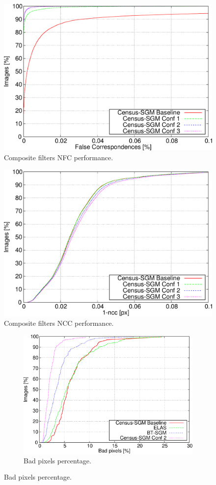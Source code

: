 \begin{figure}[h!]
  \centering
  \includegraphics[width=\textwidth, height=0.5\textwidth, trim=0 0 0 0,clip]{comp_nfc_perc}
  \caption{ Composite filters NFC performance.}
  \label{fig:cp03_composite_NFC}
\end{figure}%

\begin{figure}[h!]
  \centering
  \includegraphics[width=\textwidth, height=0.5\textwidth, trim=0 0 0 0,clip]{comp_ncc}
  \caption{ Composite filters NCC performance.}
  \label{fig:cp03_composite_NCC}
\end{figure}%

\begin{figure}[h!]
  \centering
  \begin{subfigure}[h]{\textwidth}
    \centering
    \includegraphics[width=\textwidth, height=0.5\textwidth, trim=0 0 0 0,clip]{algo_bpp_ee3}
    \caption{ Bad pixels percentage. }
    \label{fig:cp03_algorithms_LGT_bpp}
  \end{subfigure}%
\end{figure}

